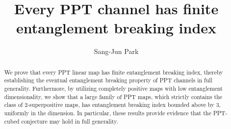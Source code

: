 \documentclass[11pt,reqno]{amsart}
\author{Sang-Jun Park}
\title[Every PPT map has finite EB index] {Every PPT channel has finite entanglement breaking index}
\theoremstyle{definition}
\theoremstyle{definition}
\theoremstyle{definition}
\theoremstyle{definition}
\begin{document}
\begin{abstract}
We prove that every PPT linear map has finite entanglement breaking index, thereby establishing the eventual entanglement breaking property of PPT channels in full generality. Furthermore, by utilizing completely positive maps with low entanglement dimensionality, we show that a large family of PPT maps, which strictly contains the class of 2-superpositive maps, has entanglement breaking index bounded above by 3, uniformly in the dimension. In particular, these results provide evidence that the PPT-cubed conjecture may hold in full generality.
\end{abstract}

\maketitle

\tableofcontents
\end{document}
